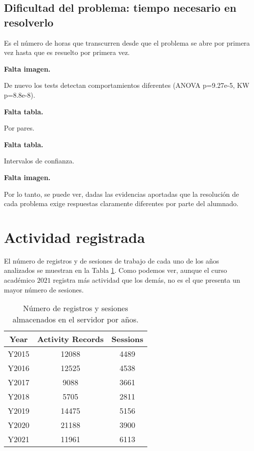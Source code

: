 \subsection{Dificultad del problema: tiempo necesario en resolverlo}

Es el número de horas que transcurren desde que el problema se abre por primera vez hasta que es resuelto por primera vez.

\textbf{Falta imagen.}

De nuevo los tests detectan comportamientos diferentes (ANOVA p=9.27e-5, KW p=8.8e-8).

\textbf{Falta tabla.}

Por pares.

\textbf{Falta tabla.}

Intervalos de confianza.

\textbf{Falta imagen.}

Por lo tanto, se puede ver, dadas las evidencias aportadas que la resolución de cada problema exige respuestas claramente diferentes por parte del alumnado.

\section{Actividad registrada}\label{sec:activityrecorded}

El número de registros y de sesiones de trabajo de cada uno de los años analizados se muestran en la Tabla \ref{tab:records}. Como podemos ver, aunque el curso académico $2021$ registra más actividad que los demás, no es el que presenta un mayor número de sesiones.

\begin{table}[H]
\centering
\caption{Número de registros y sesiones almacenados en el servidor por años.}
\label{tab:records}
\begin{tabular}{ccc}
\hline
\textbf{Year}  & \textbf{Activity Records} & \textbf{Sessions}  \\ \hline
Y2015 & 12088            &  4489  \\
Y2016 & 12525            &  4538  \\
Y2017 & 9088             &  3661  \\
Y2018 & 5705             &  2811  \\
Y2019 & 14475            &  5156  \\
Y2020 & 21188            &  3900  \\
Y2021 & 11961            &  6113  \\ \hline
\end{tabular}
\end{table}

